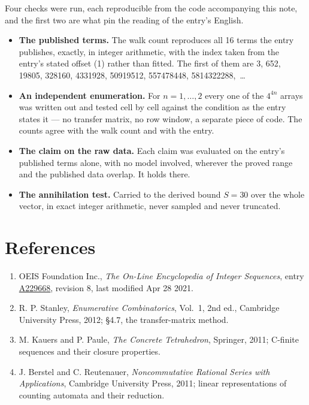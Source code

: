 \documentclass[11pt]{article}
\theoremstyle{definition}
\begin{document}
Four checks were run, each reproducible from the code accompanying this note, and the first two are what pin the reading of the entry's English.

\begin{itemize}

\item {\bfseries The published terms.} The walk count reproduces all 16 terms the entry publishes, exactly, in integer arithmetic, with the index taken from the entry's stated offset (1) rather than fitted. The first of them are 3, 652, 19805, 328160, 4331928, 50919512, 557478448, 5814322288,~\dots

\item {\bfseries An independent enumeration.} For $n = 1,\dots,2$ every one of the $4^{4n}$ arrays was written out and tested cell by cell against the condition as the entry states it --- no transfer matrix, no row window, a separate piece of code. The counts agree with the walk count and with the entry.

\item {\bfseries The claim on the raw data.} Each claim was evaluated on the entry's published terms alone, with no model involved, wherever the proved range and the published data overlap. It holds there.

\item {\bfseries The annihilation test.} Carried to the derived bound $S = 30$ over the whole vector, in exact integer arithmetic, never sampled and never truncated.

\end{itemize}

\section{References}

\begin{enumerate}

\item OEIS Foundation Inc., \emph{The On-Line Encyclopedia of Integer Sequences}, entry \href{https://oeis.org/A229668}{A229668}, revision 8, last modified Apr 28 2021.

\item R. P. Stanley, \emph{Enumerative Combinatorics}, Vol.~1, 2nd ed., Cambridge University Press, 2012; \S4.7, the transfer-matrix method.

\item M. Kauers and P. Paule, \emph{The Concrete Tetrahedron}, Springer, 2011; C-finite sequences and their closure properties.

\item J. Berstel and C. Reutenauer, \emph{Noncommutative Rational Series with Applications}, Cambridge University Press, 2011; linear representations of counting automata and their reduction.

\end{enumerate}
\end{document}
